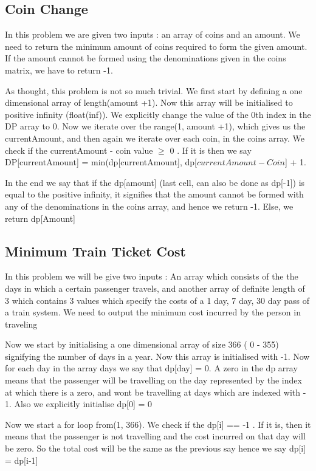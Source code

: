 \documentclass{article}
\newcommand{\nd}{\noindent}
\begin{document}
\subsection{Coin Change}
In this problem we are given two inputs : an array of coins and an amount. We need to return the minimum amount of coins required to form the given amount. If the amount cannot be formed using the denominations given in the coins matrix, we have to return -1. 

\nd As thought, this problem is not so much trivial. We first start by defining a one dimensional array of length(amount +1). Now this array will be initialised to positive infinity (float(inf)). We explicitly change the value of the 0th index in the DP array to 0. 
Now we iterate over the range(1, amount +1), which gives us the currentAmount,  and then again we iterate over each coin, in the coins array. We check if the currentAmount - coin value $\geq$ 0 . If it is then we say DP[currentAmount] = min(dp[currentAmount], dp[$currentAmount - Coin$] + 1. 

\nd In the end we say that if the dp[amount] (last cell, can also be done as dp[-1]) is equal to the positive infinity, it signifies that the amount cannot be formed with any of the denominations in the coins array, and hence we return -1. Else, we return dp[Amount]

\subsection{Minimum Train Ticket Cost}
In this problem we will be give two inputs : An array which consists of the the days in which a certain passenger travels, and another array of definite length of 3 which contains 3 values which specify the costs of a 1 day, 7 day, 30 day pass of a train system. We need to output the minimum cost incurred by the person in traveling 

\nd Now we start by initialising a one dimensional array of size 366 ( 0 - 355) signifying the number of days in a year. Now this array is initialised with -1. Now for each day in the array days we say that dp[day] = 0. A zero in the dp array means that the passenger will be travelling on the day represented by the index at which there is a zero, and wont be travelling at days which are indexed with - 1. Also we explicitly initialise dp[0] = 0 

\nd Now we start a for loop from(1, 366). We check if the dp[i] == -1 . If it is, then it means that the passenger is not travelling and the cost incurred on that day will be zero. So the total cost will be the same as the previous say hence we say dp[i] = dp[i-1]
\end{document}
